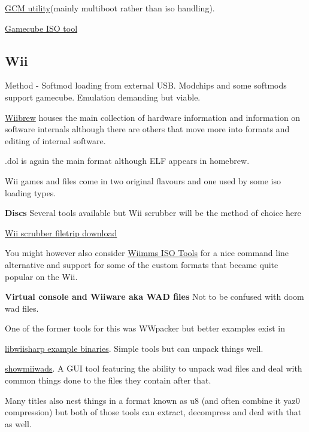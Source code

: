 \documentclass[
]{book}
\begin{document}
\href{http://filetrip.net/wii-downloads/other-files/download-gcmutility-05-f606.html}{GCM utility}(mainly multiboot rather than iso handling).

\href{http://filetrip.net/wii-downloads/tools-utilities/latest-gamecube-iso-tool-f28774.html}{Gamecube ISO tool}

\hypertarget{wii}{%
\subsection{Wii}\label{wii}}

Method - Softmod loading from external USB. Modchips and some softmods support gamecube. Emulation demanding but viable.

\href{http://wiibrew.org/wiki/Wii_Hardware}{Wiibrew} houses the main collection of hardware information and information on software internals although there are others that move more into formats and editing of internal software.

.dol is again the main format although ELF appears in homebrew.

Wii games and files come in two original flavours and one used by some iso loading types.

\textbf{Discs} Several tools available but Wii scrubber will be the method of choice here

\href{http://filetrip.net/wii-downloads/other-files/download-wiiscrubber-kit-with-multiloader-140-f4399.html}{Wii scrubber filetrip download}

You might however also consider \href{http://wit.wiimm.de/}{Wiimms ISO Tools} for a nice command line alternative and support for some of the custom formats that became quite popular on the Wii.

\textbf{Virtual console and Wiiware aka WAD files} Not to be confused with doom wad files.

One of the former tools for this was WWpacker but better examples exist in

\href{https://code.google.com/p/libwiisharp/}{libwiisharp example binaries}. Simple tools but can unpack things well.

\href{http://code.google.com/p/showmiiwads/}{showmiiwads}. A GUI tool featuring the ability to unpack wad files and deal with common things done to the files they contain after that.

Many titles also nest things in a format known as u8 (and often combine it yaz0 compression) but both of those tools can extract, decompress and deal with that as well.
\end{document}
